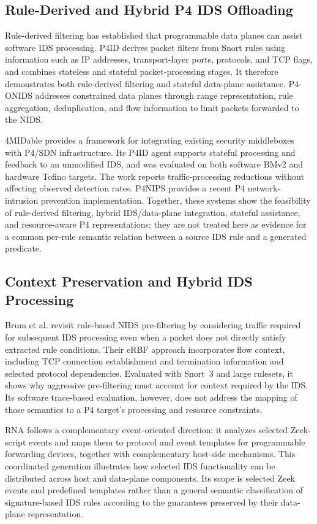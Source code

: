 \documentclass{article}
\begin{document}
\subsection{Rule-Derived and Hybrid P4 IDS Offloading}
Rule-derived filtering has established that programmable data planes can
assist software IDS processing. P4ID \cite{lewis2019p4id} derives packet
filters from Snort rules using information such as IP addresses,
transport-layer ports, protocols, and TCP flags, and combines stateless and
stateful packet-processing stages. It therefore demonstrates both
rule-derived filtering and stateful data-plane assistance. P4-ONIDS
\cite{tavares2021p4onids} addresses constrained data planes through range
representation, rule aggregation, deduplication, and flow information to
limit packets forwarded to the NIDS.

4MIDable \cite{lewis2023fourmidable} provides a framework for integrating
existing security middleboxes with P4/SDN infrastructure. Its P4ID agent
supports stateful processing and feedback to an unmodified IDS, and was
evaluated on both software BMv2 and hardware Tofino targets. The work reports
traffic-processing reductions without affecting observed detection rates.
P4NIPS \cite{senoski2025p4nips} provides a recent P4 network-intrusion
prevention implementation. Together, these systems show the feasibility of
rule-derived filtering, hybrid IDS/data-plane integration, stateful
assistance, and resource-aware P4 representations; they are not treated here
as evidence for a common per-rule semantic relation between a source IDS rule
and a generated predicate.

\subsection{Context Preservation and Hybrid IDS Processing}
Brum et al. \cite{brum2025rethinking} revisit rule-based NIDS
pre-filtering by considering traffic required for subsequent IDS processing
even when a packet does not directly satisfy extracted rule conditions. Their
eRBF approach incorporates flow context, including TCP connection
establishment and termination information and selected protocol dependencies.
Evaluated with Snort~3 and large rulesets, it shows why aggressive
pre-filtering must account for context required by the IDS. Its software
trace-based evaluation, however, does not address the mapping of those
semantics to a P4 target's processing and resource constraints.

RNA \cite{hagen2025rna} follows a complementary event-oriented direction:
it analyzes selected Zeek-script events and maps them to protocol and event
templates for programmable forwarding devices, together with complementary
host-side mechanisms. This coordinated generation illustrates how selected
IDS functionality can be distributed across host and data-plane components.
Its scope is selected Zeek events and predefined templates rather than a
general semantic classification of signature-based IDS rules according to the
guarantees preserved by their data-plane representation.
\end{document}
